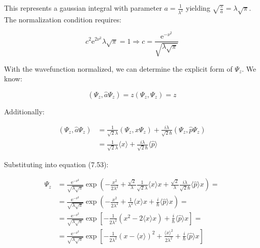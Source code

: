 \documentclass[10pt]{article}
\begin{document}
This represents a gaussian integral with parameter $a=\frac{1}{\lambda^{2}}$ yielding $\sqrt{\frac{\pi}{a}}=\lambda \sqrt{\pi}$. The normalization condition requires:

\begin{equation*}
c^{2} \mathrm{e}^{2 \nu^{2}} \lambda \sqrt{\pi}=1 \Longrightarrow c=\frac{\mathrm{e}^{-\nu^{2}}}{\sqrt{\lambda \sqrt{\pi}}} \tag{7.58}
\end{equation*}

With the wavefunction normalized, we can determine the explicit form of $\Psi_{z}$. We know:

\begin{equation*}
\left(\Psi_{z}, \hat{a} \Psi_{z}\right)=z\left(\Psi_{z}, \Psi_{z}\right)=z \tag{7.59}
\end{equation*}

Additionally:

\begin{align*}
\left(\Psi_{z}, \hat{a} \Psi_{z}\right) & =\frac{1}{\sqrt{2} \lambda}\left(\Psi_{z}, x \Psi_{z}\right)+\frac{i \lambda}{\sqrt{2} \hbar}\left(\Psi_{z}, \hat{p} \Psi_{z}\right)  \tag{7.60}\\
& =\frac{1}{\sqrt{2} \lambda}\langle x\rangle+\frac{i \lambda}{\sqrt{2} \hbar}\langle\hat{p}\rangle
\end{align*}

Substituting into equation (7.53):

\begin{align*}
\Psi_{z} & =\frac{\mathrm{e}^{-\nu^{2}}}{\sqrt{\lambda \sqrt{\pi}}} \exp \left(-\frac{x^{2}}{2 \lambda^{2}}+\frac{\sqrt{2}}{\lambda} \frac{1}{\sqrt{2} \lambda}\langle x\rangle x+\frac{\sqrt{2}}{\lambda} \frac{i \lambda}{\sqrt{2} \hbar}\langle\hat{p}\rangle x\right)= \\
& =\frac{\mathrm{e}^{-\nu^{2}}}{\sqrt{\lambda \sqrt{\pi}}} \exp \left(-\frac{x^{2}}{2 \lambda^{2}}+\frac{1}{\lambda^{2}}\langle x\rangle x+\frac{i}{\hbar}\langle\hat{p}\rangle x\right)= \\
& =\frac{\mathrm{e}^{-\nu^{2}}}{\sqrt{\lambda \sqrt{\pi}}} \exp \left[-\frac{1}{2 \lambda^{2}}\left(x^{2}-2\langle x\rangle x\right)+\frac{i}{\hbar}\langle\hat{p}\rangle x\right]=  \tag{7.61}\\
& =\frac{\mathrm{e}^{-\nu^{2}}}{\sqrt{\lambda \sqrt{\pi}}} \exp \left[-\frac{1}{2 \lambda^{2}}(x-\langle x\rangle)^{2}+\frac{\langle x\rangle^{2}}{2 \lambda^{2}}+\frac{i}{\hbar}\langle\hat{p}\rangle x\right]
\end{align*}
\end{document}
